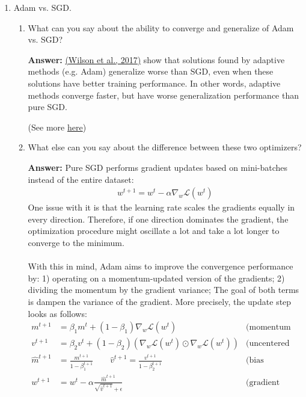 \documentclass{article}
\newenvironment{QandA}{\begin{enumerate}[label=\arabic*.]}{\end{enumerate}}
\newenvironment{InnerQandA}{\begin{enumerate}[label=\roman*.]}{\end{enumerate}}
\newenvironment{answer}{\par\normalfont \textbf{Answer:}}{}
\begin{document}
\begin{QandA}
\begin{answer}
        (See more \href{https://towardsdatascience.com/learning-parameters-part-5-65a2f3583f7d}{here})
    \end{answer}

    \item Adam vs. SGD.
    \begin{InnerQandA}
        \item What can you say about the ability to converge and generalize of Adam vs. SGD?
        \begin{answer}
            \href{https://arxiv.org/abs/1705.08292}{(Wilson et al., 2017)} show that solutions found by adaptive methods (e.g. Adam) generalize worse than SGD, even when these solutions have better training performance. In other words, adaptive methods converge faster, but have worse generalization performance than pure SGD. 

            (See more \href{https://shaoanlu.wordpress.com/2017/05/29/sgd-all-which-one-is-the-best-optimizer-dogs-vs-cats-toy-experiment/}{here})
        \end{answer}

        \item What else can you say about the difference between these two optimizers?
        \begin{answer}
            Pure SGD performs gradient updates based on mini-batches instead of the entire dataset:
            \begin{align*}
                w^{t+1} = w^t - \alpha \nabla_w \mathcal{L}(w^t)
            \end{align*}
            One issue with it is that the learning rate scales the gradients equally in every direction. Therefore, if one direction dominates the gradient, the optimization procedure might oscillate a lot and take a lot longer to converge to the minimum. \\\\
            With this in mind, Adam aims to improve the convergence performance by: 1) operating on a momentum-updated version of the gradients; 2) dividing the momentum by the gradient variance; The goal of both terms is dampen the variance of the gradient. More precisely, the update step looks as follows:
            \begin{align*}
                m^{t+1} &= \beta_1 m^t + (1-\beta_1)\nabla_w \mathcal{L}(w^t) &\text{(momentum gradient)} \\
                v^{t+1} &= \beta_2 v^{t} + (1-\beta_2)(\nabla_w \mathcal{L}(w^t) \odot \nabla_w \mathcal{L}(w^t)) &\text{(uncentered variance)}  \\
                \hat{m}^{t+1} &= \frac{m^{t+1}}{1 - \beta_1^{t+1}} \quad\quad \hat{v}^{t+1} = \frac{v^{t+1}}{1 - \beta_2^{t+1}} &\text{(bias correction)} \\
                w^{t+1} &= w^t - \alpha \frac{\hat{m}^{t+1}}{\sqrt{\hat{v}^{t+1}} + \epsilon} & \text{(gradient step)}
            \end{align*}
        \end{answer}
    \end{InnerQandA}


\end{QandA}
\end{document}
